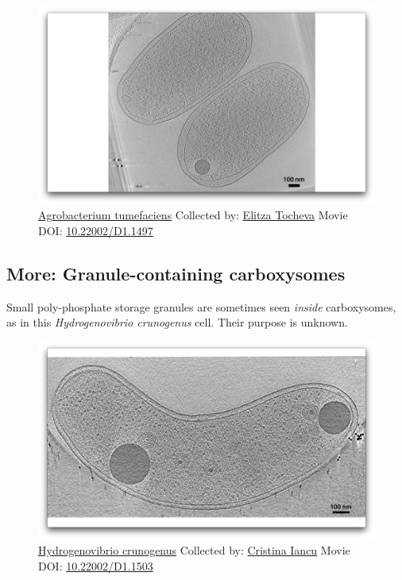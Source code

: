 \documentclass[]{tufte-book}
\begin{document}
\begin{figure}
\includegraphics{movie_stills/4_9} \caption[\protect\hyperlink{tree}{Agrobacterium tumefaciens} Collected
by: \protect\hyperlink{elitza_tocheva}{Elitza Tocheva} Movie DOI:
\href{https://doi.org/10.22002/D1.1497}{10.22002/D1.1497}]{\protect\hyperlink{tree}{Agrobacterium tumefaciens} Collected
by: \protect\hyperlink{elitza_tocheva}{Elitza Tocheva} Movie DOI:
\href{https://doi.org/10.22002/D1.1497}{10.22002/D1.1497}}\label{fig:4-9}
\end{figure}

\hypertarget{Granule-containing_carboxysomes}{\subsection*{More:
Granule-containing carboxysomes}\label{Granule-containing_carboxysomes}}

Small poly-phosphate storage granules are sometimes seen \emph{inside}
carboxysomes, as in this \emph{Hydrogenovibrio crunogenus} cell. Their
purpose is unknown.





\begin{figure}
\includegraphics{movie_stills/4_9a} \caption[\protect\hyperlink{tree}{Hydrogenovibrio crunogenus}
Collected by: \protect\hyperlink{cristina_iancu}{Cristina Iancu} Movie
DOI: \href{https://doi.org/10.22002/D1.1503}{10.22002/D1.1503}]{\protect\hyperlink{tree}{Hydrogenovibrio crunogenus}
Collected by: \protect\hyperlink{cristina_iancu}{Cristina Iancu} Movie
DOI: \href{https://doi.org/10.22002/D1.1503}{10.22002/D1.1503}}\label{fig:4-9a}
\end{figure}
\end{document}
